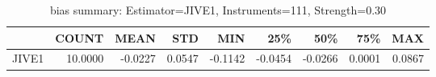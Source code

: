 \begin{table}[ht]
\centering
\caption{bias summary: Estimator=JIVE1, Instruments=111, Strength=0.30}
\begin{tabular}{lrrrrrrrr}
\toprule
 & COUNT & MEAN & STD & MIN & 25\% & 50\% & 75\% & MAX \\
\midrule
JIVE1 & 10.0000 & -0.0227 & 0.0547 & -0.1142 & -0.0454 & -0.0266 & 0.0001 & 0.0867 \\
\bottomrule
\end{tabular}
\end{table}

